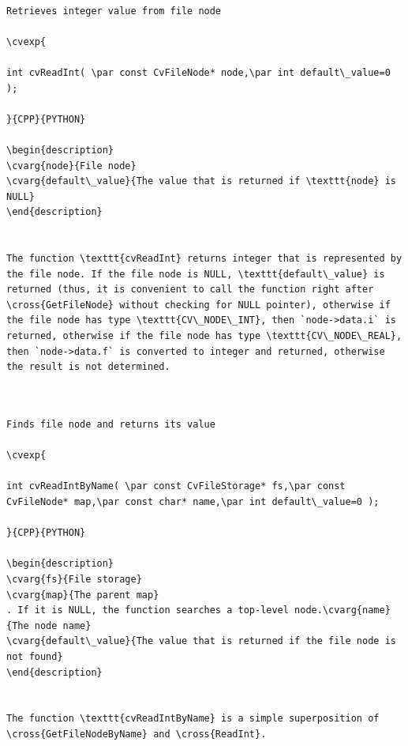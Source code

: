 \begin{verbatim}

Retrieves integer value from file node

\cvexp{

int cvReadInt( \par const CvFileNode* node,\par int default\_value=0 );

}{CPP}{PYTHON}

\begin{description}
\cvarg{node}{File node}
\cvarg{default\_value}{The value that is returned if \texttt{node} is NULL}
\end{description}


The function \texttt{cvReadInt} returns integer that is represented by the file node. If the file node is NULL, \texttt{default\_value} is returned (thus, it is convenient to call the function right after \cross{GetFileNode} without checking for NULL pointer), otherwise if the file node has type \texttt{CV\_NODE\_INT}, then `node->data.i` is returned, otherwise if the file node has type \texttt{CV\_NODE\_REAL}, then `node->data.f` is converted to integer and returned, otherwise the result is not determined.


\end{verbatim}
\label{ReadIntByName}
\begin{verbatim}

Finds file node and returns its value

\cvexp{

int cvReadIntByName( \par const CvFileStorage* fs,\par const CvFileNode* map,\par const char* name,\par int default\_value=0 );

}{CPP}{PYTHON}

\begin{description}
\cvarg{fs}{File storage}
\cvarg{map}{The parent map}
. If it is NULL, the function searches a top-level node.\cvarg{name}{The node name}
\cvarg{default\_value}{The value that is returned if the file node is not found}
\end{description}


The function \texttt{cvReadIntByName} is a simple superposition of \cross{GetFileNodeByName} and \cross{ReadInt}.


\end{verbatim}
\label{ReadReal}
